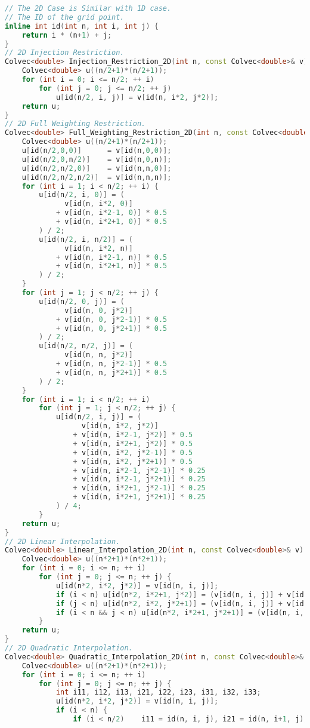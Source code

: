 \documentclass{ctexart}
\begin{document}
\begin{lstlisting}[language=c++]
// The 2D Case is Similar with 1D case.
// The ID of the grid point.
inline int id(int n, int i, int j) {
	return i * (n+1) + j;
}
// 2D Injection Restriction.
Colvec<double> Injection_Restriction_2D(int n, const Colvec<double>& v) {
	Colvec<double> u((n/2+1)*(n/2+1));
	for (int i = 0; i <= n/2; ++ i)
		for (int j = 0; j <= n/2; ++ j)
			u[id(n/2, i, j)] = v[id(n, i*2, j*2)];
	return u;
}
// 2D Full Weighting Restriction.
Colvec<double> Full_Weighting_Restriction_2D(int n, const Colvec<double>& v) {
	Colvec<double> u((n/2+1)*(n/2+1));
	u[id(n/2,0,0)]		= v[id(n,0,0)];
	u[id(n/2,0,n/2)]	= v[id(n,0,n)];
	u[id(n/2,n/2,0)] 	= v[id(n,n,0)];
	u[id(n/2,n/2,n/2)]	= v[id(n,n,n)];
	for (int i = 1; i < n/2; ++ i) {
		u[id(n/2, i, 0)] = (
			  v[id(n, i*2, 0)]
			+ v[id(n, i*2-1, 0)] * 0.5
			+ v[id(n, i*2+1, 0)] * 0.5
		) / 2;
		u[id(n/2, i, n/2)] = (
			  v[id(n, i*2, n)]
			+ v[id(n, i*2-1, n)] * 0.5
			+ v[id(n, i*2+1, n)] * 0.5
		) / 2;
	}
	for (int j = 1; j < n/2; ++ j) {
		u[id(n/2, 0, j)] = (
			  v[id(n, 0, j*2)]
			+ v[id(n, 0, j*2-1)] * 0.5
			+ v[id(n, 0, j*2+1)] * 0.5
		) / 2;
		u[id(n/2, n/2, j)] = (
			  v[id(n, n, j*2)]
			+ v[id(n, n, j*2-1)] * 0.5
			+ v[id(n, n, j*2+1)] * 0.5
		) / 2;
	}
	for (int i = 1; i < n/2; ++ i)
		for (int j = 1; j < n/2; ++ j) {
			u[id(n/2, i, j)] = (
				  v[id(n, i*2, j*2)]
				+ v[id(n, i*2-1, j*2)] * 0.5
				+ v[id(n, i*2+1, j*2)] * 0.5
				+ v[id(n, i*2, j*2-1)] * 0.5
				+ v[id(n, i*2, j*2+1)] * 0.5
				+ v[id(n, i*2-1, j*2-1)] * 0.25
				+ v[id(n, i*2-1, j*2+1)] * 0.25
				+ v[id(n, i*2+1, j*2-1)] * 0.25
				+ v[id(n, i*2+1, j*2+1)] * 0.25
			) / 4;
		}
	return u;
}
// 2D Linear Interpolation.
Colvec<double> Linear_Interpolation_2D(int n, const Colvec<double>& v) {
	Colvec<double> u((n*2+1)*(n*2+1));
	for (int i = 0; i <= n; ++ i)
		for (int j = 0; j <= n; ++ j) {
			u[id(n*2, i*2, j*2)] = v[id(n, i, j)];
			if (i < n) u[id(n*2, i*2+1, j*2)] = (v[id(n, i, j)] + v[id(n, i+1, j)]) / 2;
			if (j < n) u[id(n*2, i*2, j*2+1)] = (v[id(n, i, j)] + v[id(n, i, j+1)]) / 2;
			if (i < n && j < n) u[id(n*2, i*2+1, j*2+1)] = (v[id(n, i, j)] + v[id(n, i+1, j)] + v[id(n, i, j+1)] + v[id(n, i+1, j+1)]) / 4;
		}
	return u;
}
// 2D Quadratic Interpolation.
Colvec<double> Quadratic_Interpolation_2D(int n, const Colvec<double>& v) {
	Colvec<double> u((n*2+1)*(n*2+1));
	for (int i = 0; i <= n; ++ i)
		for (int j = 0; j <= n; ++ j) {
			int i11, i12, i13, i21, i22, i23, i31, i32, i33;
			u[id(n*2, i*2, j*2)] = v[id(n, i, j)];
			if (i < n) {
				if (i < n/2)	i11 = id(n, i, j), i21 = id(n, i+1, j), i31 = id(n, i+2, j);

\end{lstlisting}
\end{document}
